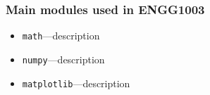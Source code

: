 \documentclass[14pt]{beamer}
\begin{document}
%
%
%
%
%

%
%


\begin{frame}[fragile]
\frametitle{Main modules used in ENGG1003}
\begin{itemize}
\item \texttt{math}---description
\item \texttt{numpy}---description
\item \texttt{matplotlib}---description
\end{itemize}



\end{frame}

%
%
\end{document}
